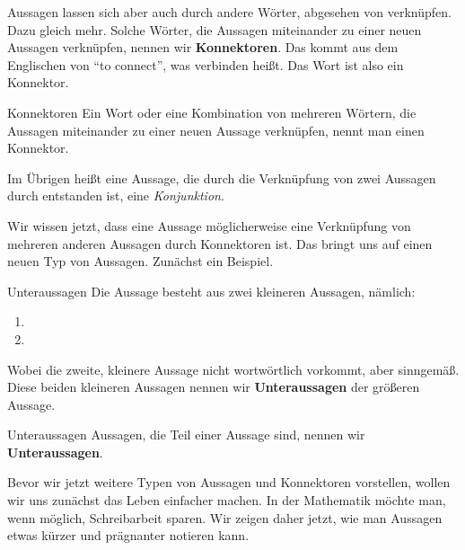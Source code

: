 \documentclass[../../main.tex]{subfiles}
\begin{document}
Aussagen lassen sich aber auch durch andere Wörter, abgesehen von  verknüpfen. Dazu gleich mehr. Solche Wörter, die Aussagen miteinander zu einer neuen Aussagen verknüpfen, nennen wir \textbf{Konnektoren}. Das kommt aus dem Englischen von \enquote{to connect}, was verbinden heißt. Das Wort  ist also ein Konnektor.

\begin{definition}{Konnektoren}
Ein Wort oder eine Kombination von mehreren Wörtern, die Aussagen miteinander zu einer neuen Aussage verknüpfen, nennt man einen Konnektor.
\end{definition}

Im Übrigen heißt eine Aussage, die durch die Verknüpfung von zwei Aussagen durch 
entstanden ist, eine \textit{Konjunktion}.

Wir wissen jetzt, dass eine Aussage möglicherweise eine Verknüpfung von mehreren
anderen Aussagen durch Konnektoren ist. Das bringt uns auf einen neuen Typ von Aussagen.
Zunächst ein Beispiel.
\begin{example}{Unteraussagen}
Die Aussage  besteht aus zwei kleineren Aussagen, nämlich:
\begin{enumerate}
    \item {}
    \item {}
\end{enumerate}
Wobei die zweite, kleinere Aussage nicht wortwörtlich vorkommt, aber sinngemäß.
Diese beiden kleineren Aussagen nennen wir \textbf{Unteraussagen} der größeren Aussage.
\end{example}

\begin{definition}{Unteraussagen}
Aussagen, die Teil einer Aussage sind, nennen wir \textbf{Unteraussagen}.
\end{definition}


Bevor wir jetzt weitere Typen von Aussagen und Konnektoren vorstellen, wollen wir uns zunächst das Leben einfacher machen.
In der Mathematik möchte man, wenn möglich, Schreibarbeit sparen. Wir zeigen daher jetzt, wie man Aussagen etwas kürzer und prägnanter notieren kann.
\end{document}
